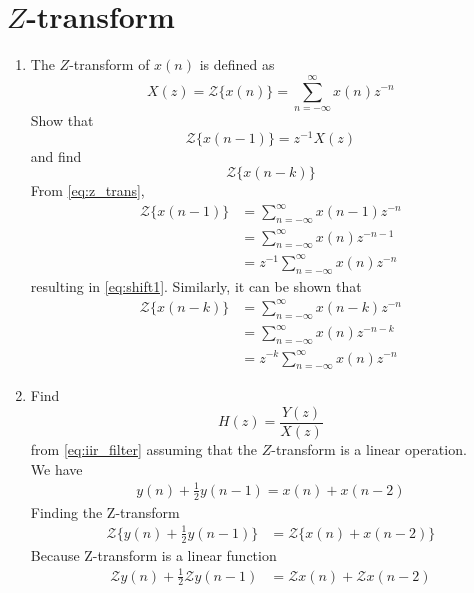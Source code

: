 \documentclass[journal,12pt,twocolumn]{IEEEtran}
\renewcommand\thesection{\arabic{section}}
\begin{document}
\section{$Z$-transform}
\begin{enumerate}[label=\thesection.\arabic*]
\item The $Z$-transform of $x(n)$ is defined as
%
\begin{equation}
\label{eq:z_trans}
X(z)={\mathcal {Z}}\{x(n)\}=\sum _{n=-\infty }^{\infty }x(n)z^{-n}
\end{equation}
%
Show that
\begin{equation}
\label{eq:shift1}
{\mathcal {Z}}\{x(n-1)\} = z^{-1}X(z)
\end{equation}
and find
\begin{equation}
	{\mathcal {Z}}\{x(n-k)\} 
\end{equation}
\solution From \eqref{eq:z_trans},
\begin{align}
{\mathcal {Z}}\{x(n-1)\} &=\sum _{n=-\infty }^{\infty }x(n-1)z^{-n}
\\
&=\sum _{n=-\infty }^{\infty }x(n)z^{-n-1} \\
&=z^{-1}\sum _{n=-\infty }^{\infty }x(n)z^{-n}
\end{align}
resulting in \eqref{eq:shift1}. Similarly, it can be shown that
%
\begin{align}
  {\mathcal {Z}}\{x(n-k)\} &=\sum _{n=-\infty }^{\infty }x(n-k)z^{-n}
  \\
  &=\sum _{n=-\infty }^{\infty }x(n)z^{-n-k} \\
  &=z^{-k}\sum _{n=-\infty }^{\infty }x(n)z^{-n}
  \label{eq:z_trans_shift}
  \end{align}
\item Find
%
\begin{equation}
H(z) = \frac{Y(z)}{X(z)}
\end{equation}
%
from  \eqref{eq:iir_filter} assuming that the $Z$-transform is a linear operation.
\\
\solution We have
\begin{align}
  y(n) + \frac{1}{2}y(n-1) = x(n) + x(n-2)
\end{align} 
Finding the Z-transform 
\begin{align}
  {\mathcal {Z}}\{y(n) + \frac{1}{2}y(n-1)\} &= {\mathcal {Z}}\{x(n)+x(n-2)\}
\end{align}
Because Z-transform is a linear function
\begin{align}
  {\mathcal {Z}}y(n) + \frac{1}{2}{\mathcal {Z}}y(n-1) &= {\mathcal {Z}}x(n)+{\mathcal {Z}}x(n-2)

\end{align}
\end{enumerate}
\end{document}
